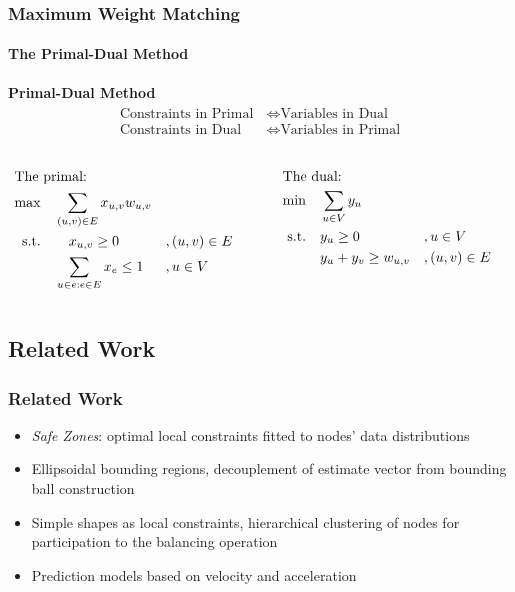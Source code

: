 \documentclass[hyperref={pdfpagelabels=false}]{beamer}
\begin{document}
\begin{frame} \frametitle{Maximum Weight Matching}\framesubtitle{The Primal-Dual Method}
\textbf{Primal-Dual Method}
\begin{align*}
\begin{split}
\text{Constraints in Primal}&\Longleftrightarrow \text{Variables in Dual}\\
\text{Constraints in Dual}\quad &\Longleftrightarrow \text{Variables in Primal}
\end{split}
\end{align*}
\begin{columns}
\begin{column}[t]{0.49\textwidth}
\vspace{-1.5cm}
\begin{align*}
\intertext{The primal:}
\max&\quad \sum_{(u,v) \in E} x_{u,v} w_{u,v}\\
\text{s.t.} &\qquad x_{u,v}\geq 0 &&, (u,v) \in E \\
	&\quad \sum_{u \in e: e\in E} x_e \leq 1 &&, u \in V
\end{align*}\end{column}
\begin{column}[t]{0.49\textwidth}
\vspace{-1.5cm}
\begin{align*}
\intertext{The dual:}
\min&\quad \sum_{u \in V} y_u\\
\text{s.t.} &\quad y_u\geq 0 &&, u \in V\\
	&\quad y_u+y_v \geq w_{u,v} &&,(u,v) \in E
\end{align*}
\end{column}
\end{columns}
\end{frame}

\subsection{Related Work}
\begin{frame} \frametitle{Related Work}
\begin{itemize}
\item \emph{Safe Zones}: optimal local constraints fitted to nodes' data distributions
\item Ellipsoidal bounding regions, decouplement of estimate vector from bounding ball construction
\item Simple shapes as local constraints, hierarchical clustering of nodes for participation to the balancing operation
\item Prediction models based on velocity and acceleration
\end{itemize}
\end{frame}
\end{document}
